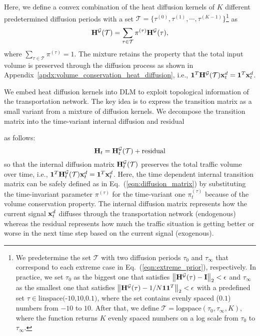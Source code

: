 \documentclass[journal]{IEEEtran}
\makeatletter
\DeclareRobustCommand{\stopchange}{\@bsphack
  \normalcolor
  \@esphack
}
\makeatother
\begin{document}
Here, we define a convex combination of the heat diffusion kernels of $K$ different predetermined diffusion periods with a set $\mathcal{T}=\{\tau^{(0)},\tau^{(1)},\cdots,\tau^{(K-1)}\}$\footnote{We predetermine the set $\mathcal{T}$ with two diffusion periods $\tau_0$ and $\tau_\infty$ that correspond to each extreme case in Eq.~(\ref{eqn:extreme_prior}), respectively. In practice, we set $\tau_0$ as the biggest one that satisfies $\left\Vert{\bf{H}}^{\mathcal{G}}(\tau)-{\bf{I}}\right\Vert_2<\epsilon$ and $\tau_\infty$ as the smallest one that satisfies $\left\Vert{\bf{H}}^{\mathcal{G}}(\tau)-1/N{\bf{1}}{\bf{1}}^T\right\Vert_2<\epsilon$ with a predefined set $\tau\in\text{linspace(-10,10,0.1)}$, where the set contains evenly spaced ($0.1$) numbers from $-10$ to $10$.
After that, we define
$\mathcal{T}=\text{logspace}(\tau_0,\tau_\infty,K),$ where the function returns $K$ evenly spaced numbers on a log scale from $\tau_0$ to $\tau_\infty$.} as
\begin{equation}\label{eqn:diffusion_matrix}
    {\bf{H}}^{\mathcal{G}}(\mathcal{T})=\sum_{\tau\in\mathcal{T}}\pi^{(\tau)}{\bf{H}}^{\mathcal{G}}(\tau),
\end{equation}
where $\sum_{\tau\in\mathcal{T}}\pi^{(\tau)}=1$.
The mixture retains the property that the total input volume is preserved through the diffusion process as shown in Appendix~\ref{apdx:volume_conservation_heat_diffusion}, i.e.,
${\bf{1}}^T{\bf{H}}^{\mathcal{G}}(\mathcal{T}){\bf{x}}_t^d={\bf{1}}^T{\bf{x}}_t^d$.





We embed heat diffusion kernels into DLM to exploit topological information of the transportation network.
The key idea is to express the transition matrix as a small variant from a mixture of diffusion kernels.
We decompose the transition matrix into the time-variant internal diffusion and 
residual
\stopchange
as follows:
\begin{equation}\label{eqn:transition_matrix_decomposition}
{\bf{H}}_t={\bf{H}}_t^{\mathcal{G}}(\mathcal{T})+\text{residual}
\end{equation}
so that the internal diffusion matrix ${\bf{H}}_t^{\mathcal{G}}(\mathcal{T})$ preserves the total traffic volume over time, i.e., ${\bf{1}}^T{\bf{H}}_t^{\mathcal{G}}(\mathcal{T}){\bf{x}}_{t}^d={\bf{1}}^T{\bf{x}}_{t}^d$.
Here, the time dependent internal transition matrix can be safely defined as in Eq.~(\ref{eqn:diffusion_matrix}) by substituting the time-invariant parameter $\pi^{(\tau)}$ for the time-variant one $\pi_t^{(\tau)}$ because of the volume conservation property.
The internal diffusion matrix represents how the current signal ${\bf{x}}_t^d$ diffuses through the transportation network (endogenous) whereas
the residual represents how much the traffic situation is getting better or worse in the next time step based on the current signal (exogenous).
\end{document}
